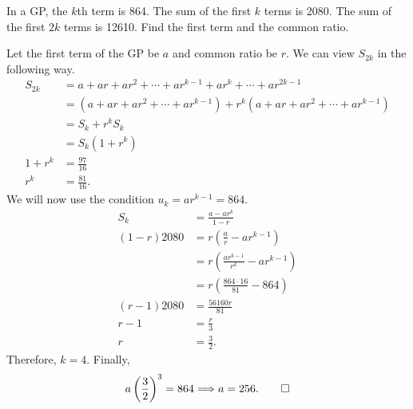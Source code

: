 \begin{question}
    In a GP, the $k$th term is 864. The sum of the first $k$ terms is 2080. The
    sum of the first $2k$ terms is 12610. Find the first term and the common
    ratio.
\end{question}
\begin{solution}
    Let the first term of the GP be $a$ and common ratio be $r$. We can view
    $S_{2k}$ in the following way.
    \begin{align*}
        S_{2k} &= a + ar + ar^2 + \cdots + ar^{k - 1} + ar^{k} + \cdots + ar^{2k - 1}\\
        &= (a + ar + ar^2 + \cdots + ar^{k - 1}) + r^k(a + ar + ar^2 + \cdots + ar^{k - 1})\\
        &= S_k + r^k S_k\\
        &= S_k (1 + r^k)\\
        1 + r^k &= \frac{97}{16}\\
        r^k &= \frac{81}{16}.
    \end{align*} 
    We will now use the condition $u_k = ar^{k - 1} = 864$.
    \begin{align*}
        S_k &= \frac{a - ar^k}{1 - r}\\
        (1 - r)2080 &= r \left( \frac{a}{r} - ar^{k - 1} \right)\\
        &= r \left( \frac{ar^{k - 1}}{r^k} - ar^{k - 1} \right)\\
        &= r \left( \frac{864 \cdot 16}{81} - 864 \right)\\
        (r - 1)2080 &= \frac{56160r}{81}\\
        r - 1 &= \frac{r}{3}\\
        r &= \frac{3}{2}.
    \end{align*}
    Therefore, $k = 4$. Finally,
    \[ a \left( \frac{3}{2} \right)^3 = 864 \Longrightarrow a = 256. \qedhere \]
\end{solution}

